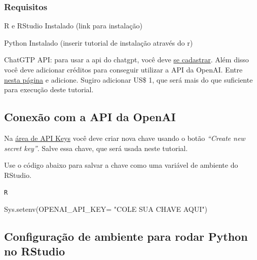 \documentclass[
  letterpaper,
  DIV=11,
  numbers=noendperiod]{scrartcl}
\newenvironment{Shaded}{\begin{snugshade}}{\end{snugshade}}
\newcommand{\AttributeTok}[1]{\textcolor[rgb]{0.40,0.45,0.13}{#1}}
\newcommand{\FunctionTok}[1]{\textcolor[rgb]{0.28,0.35,0.67}{#1}}
\newcommand{\NormalTok}[1]{\textcolor[rgb]{0.00,0.23,0.31}{#1}}
\newcommand{\OtherTok}[1]{\textcolor[rgb]{0.00,0.23,0.31}{#1}}
\newcommand{\StringTok}[1]{\textcolor[rgb]{0.13,0.47,0.30}{#1}}
\begin{document}
\hypertarget{requisitos}{%
\subsubsection{Requisitos}\label{requisitos}}

R e RStudio Instalado (link para instalação)

Python Instalado (inserir tutorial de instalação através do r)

ChatGTP API: para usar a api do chatgpt, você deve
\href{https://platform.openai.com/}{se cadastrar}. Além disso você deve
adicionar créditos para conseguir utilizar a API da OpenAI. Entre
\href{https://platform.openai.com/settings/organization/billing/overview}{nesta
página} e adicione. Sugiro adicionar US\$ 1, que será mais do que
suficiente para execução deste tutorial.

\hypertarget{conexuxe3o-com-a-api-da-openai}{%
\subsection{Conexão com a API da
OpenAI}\label{conexuxe3o-com-a-api-da-openai}}

Na \href{https://platform.openai.com/api-keys}{área de API Keys} você
deve criar nova chave usando o botão \emph{``Create new secret key''}.
Salve essa chave, que será usada neste tutorial.

Use o código abaixo para salvar a chave como uma variável de ambiente do
RStudio.

\begin{codelisting}

\caption{\texttt{R}}

\begin{Shaded}
\begin{Highlighting}[]
\FunctionTok{Sys.setenv}\NormalTok{(}\StringTok{\textasciigrave{}}\AttributeTok{OPENAI\_API\_KEY}\StringTok{\textasciigrave{}}\OtherTok{=} \StringTok{"COLE SUA CHAVE AQUI"}\NormalTok{)}
\end{Highlighting}
\end{Shaded}

\end{codelisting}

\hypertarget{configurauxe7uxe3o-de-ambiente-para-rodar-python-no-rstudio}{%
\subsection{Configuração de ambiente para rodar Python no
RStudio}\label{configurauxe7uxe3o-de-ambiente-para-rodar-python-no-rstudio}}
\end{document}
